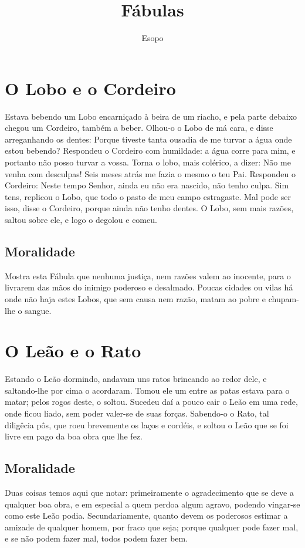 \documentclass[12pt,a4paper,article]{memoir}
\begin{document}
\title{Fábulas}
\author{Esopo}
\maketitle

\chapter{O Lobo e o Cordeiro}

Estava bebendo um Lobo encarniçado à beira de um riacho, e pela parte
debaixo chegou um Cordeiro, também a beber. Olhou-o o Lobo de má cara,
e disse arreganhando os dentes: Porque tiveste tanta ousadia de me
turvar a água onde estou bebendo? Respondeu o Cordeiro com humildade:
a água corre para mim, e portanto não posso turvar a vossa. Torna o
lobo, mais colérico, a dizer: Não me venha com desculpas! Seis meses
atrás me fazia o mesmo o teu Pai. Respondeu o Cordeiro: Neste tempo
Senhor, ainda eu não era nascido, não tenho culpa. Sim tens, replicou
o Lobo, que todo o pasto de meu campo estragaste. Mal pode ser isso,
disse o Cordeiro, porque ainda não tenho dentes. O Lobo, sem mais
razões, saltou sobre ele, e logo o degolou e comeu.


\section{Moralidade}

Mostra esta Fábula que nenhuma justiça, nem razões valem ao inocente,
para o livrarem das mãos do inimigo poderoso e desalmado. Poucas
cidades ou vilas há onde não haja estes Lobos, que sem causa nem
razão, matam ao pobre e chupam-lhe o sangue.

\chapter{O Leão e o Rato}

Estando o Leão dormindo, andavam uns ratos brincando ao redor dele, e
saltando-lhe por cima o acordaram. Tomou ele um entre as patas estava
para o matar; pelos rogos deste, o soltou. Sucedeu daí a pouco cair o
Leão em uma rede, onde ficou liado, sem poder valer-se de suas
forças. Sabendo-o o Rato, tal diligêcia pôs, que roeu brevemente os
laços e cordéis, e soltou o Leão que se foi livre em pago da boa obra
que lhe fez.

\section{Moralidade}

Duas coisas temos aqui que notar: primeiramente o agradecimento que se
deve a qualquer boa obra, e em especial a quem perdoa algum agravo,
podendo vingar-se como este Leão podia. Secundariamente, quanto devem
os poderosos estimar a amizade de qualquer homem, por fraco que seja;
porque qualquer pode fazer mal, e se não podem fazer mal, todos podem
fazer bem.
\end{document}
